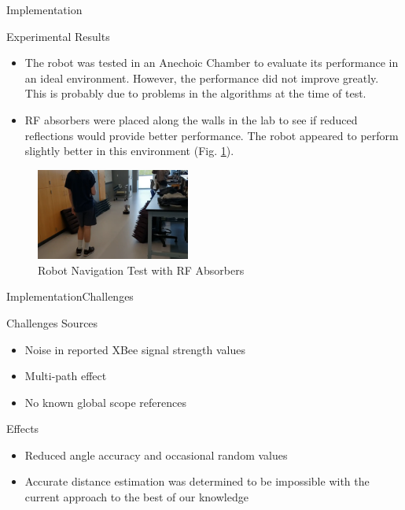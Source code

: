\documentclass{beamer}
\begin{document}
\begin{frame}{Implementation}
\begin{block}{Experimental Results}
    \begin{itemize}
      \item The robot was tested in an Anechoic Chamber to evaluate its performance in an ideal environment. However, the performance did not improve greatly. This is probably due to problems in the algorithms at the time of test.
      \item RF absorbers were placed along the walls in the lab to see if reduced reflections would provide better performance. The robot appeared to perform slightly better in this environment (Fig. \ref{fig:AbsorberTest}).
    \end{itemize}
  \end{block}
    \begin{figure}
      \centering
      \includegraphics[height=3cm]{figs/img/Absorber_test.png}
      \caption{Robot Navigation Test with RF Absorbers}
      \label{fig:AbsorberTest}
    \end{figure}
\end{frame}


\begin{frame}{Implementation}{Challenges}
  \begin{block}{Challenges}
  Sources
  \begin{itemize}
    \item Noise in reported XBee signal strength values
    \item Multi-path effect
    \item No known global scope references 
  \end{itemize}    
    Effects
    \begin{itemize}
      \item Reduced angle accuracy and occasional random values
      \item  Accurate distance estimation was determined to be impossible with the current approach to the best of our knowledge
    \end{itemize}
  \end{block}
\end{frame}
\end{document}
